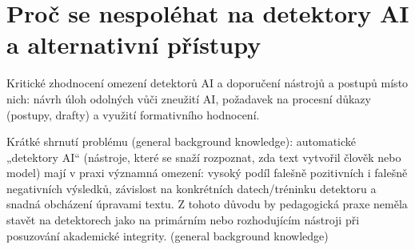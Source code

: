 \documentclass{report}%
\begin{document}
%
\section{Proč se nespoléhat na detektory AI a alternativní přístupy}%
Kritické zhodnocení omezení detektorů AI a doporučení nástrojů a postupů místo nich: návrh úloh odolných vůči zneužití AI, požadavek na procesní důkazy (postupy, drafty) a využití formativního hodnocení.%


%
\noindent
Krátké shrnutí problému (general background knowledge): automatické „detektory AI“ (nástroje, které se snaží rozpoznat, zda text vytvořil člověk nebo model) mají v praxi významná omezení: vysoký podíl falešně pozitivních i falešně negativních výsledků, závislost na konkrétních datech/tréninku detektoru a snadná obcházení úpravami textu. Z tohoto důvodu by pedagogická praxe neměla stavět na detektorech jako na primárním nebo rozhodujícím nástroji při posuzování akademické integrity. (general background knowledge)

\bigskip
\end{document}
